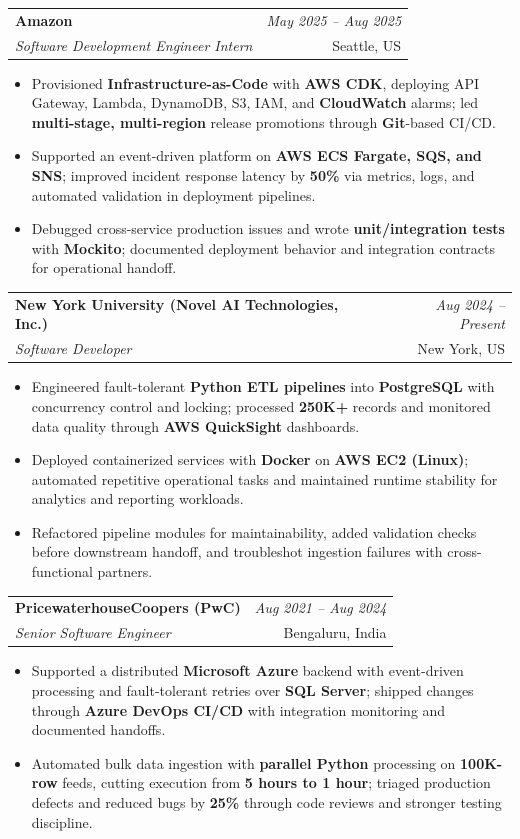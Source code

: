 \documentclass[a4paper,10pt]{article}
\makeatletter
\newcommand{\resumeSubheading}[4]{
\vspace{0.3mm}\item
    \begin{tabular*}{0.98\textwidth}[t]{l@{\extracolsep{\fill}}r}
        \textbf{#1} & \textit{\footnotesize{#4}} \\
        \textit{\footnotesize{#3}} & \footnotesize{#2}\\
    \end{tabular*}\vspace{-2mm}
}
\newcommand{\resumeItemListStart}{\begin{itemize}[leftmargin=*, labelsep=1mm, itemsep=0pt]}
\newcommand{\resumeItemListEnd}{\end{itemize}\vspace{-2mm}}
\makeatother
\begin{document}
\resumeSubheading
{Amazon}{Seattle, US}
{Software Development Engineer Intern}{May 2025 -- Aug 2025}
\resumeItemListStart
\item \footnotesize{Provisioned \textbf{Infrastructure-as-Code} with \textbf{AWS CDK}, deploying API Gateway, Lambda, DynamoDB, S3, IAM, and \textbf{CloudWatch} alarms; led \textbf{multi-stage, multi-region} release promotions through \textbf{Git}-based CI/CD.}
\item \footnotesize{Supported an event-driven platform on \textbf{AWS ECS Fargate, SQS, and SNS}; improved incident response latency by \textbf{50\%} via metrics, logs, and automated validation in deployment pipelines.}
\item \footnotesize{Debugged cross-service production issues and wrote \textbf{unit/integration tests} with \textbf{Mockito}; documented deployment behavior and integration contracts for operational handoff.}
\resumeItemListEnd

\resumeSubheading
{New York University (Novel AI Technologies, Inc.)}{New York, US}
{Software Developer}{Aug 2024 -- Present}
\resumeItemListStart
\item \footnotesize{Engineered fault-tolerant \textbf{Python ETL pipelines} into \textbf{PostgreSQL} with concurrency control and locking; processed \textbf{250K+} records and monitored data quality through \textbf{AWS QuickSight} dashboards.}
\item \footnotesize{Deployed containerized services with \textbf{Docker} on \textbf{AWS EC2 (Linux)}; automated repetitive operational tasks and maintained runtime stability for analytics and reporting workloads.}
\item \footnotesize{Refactored pipeline modules for maintainability, added validation checks before downstream handoff, and troubleshot ingestion failures with cross-functional partners.}
\resumeItemListEnd

\resumeSubheading
{PricewaterhouseCoopers (PwC)}{Bengaluru, India}
{Senior Software Engineer}{Aug 2021 -- Aug 2024}
\resumeItemListStart
\item \footnotesize{Supported a distributed \textbf{Microsoft Azure} backend with event-driven processing and fault-tolerant retries over \textbf{SQL Server}; shipped changes through \textbf{Azure DevOps CI/CD} with integration monitoring and documented handoffs.}
\item \footnotesize{Automated bulk data ingestion with \textbf{parallel Python} processing on \textbf{100K-row} feeds, cutting execution from \textbf{5 hours to 1 hour}; triaged production defects and reduced bugs by \textbf{25\%} through code reviews and stronger testing discipline.}
\resumeItemListEnd
\end{document}
